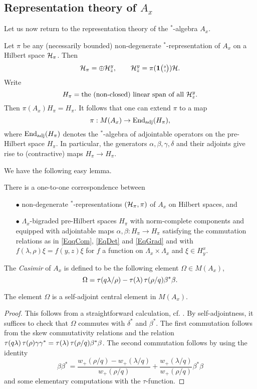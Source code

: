 \subsection{Representation theory of $A_x$}

Let us now return to the representation theory of the $^*$-algebra $A_x$.

Let $\pi$ be any (necessarily bounded) non-degenerate $^*$-representation of $A_x$ on a Hilbert space $\mathcal{H}_{\pi}$. Then \[\mathcal{H}_{\pi} = \oplus \mathcal{H}^{y}_{z},\qquad \mathcal{H}^{y}_{z} = \pi(\mathbf{1}{\tiny {\begin{pmatrix} y\\z\end{pmatrix}}})\mathcal{H}.\] Write \[H_{\pi} =  \textrm{the (non-closed) linear span of all }\mathcal{H}^{y}_{z}.\] Then $\pi(A_x)H_{\pi} = H_{\pi}$. It follows that one can extend $\pi$ to a map \[\pi: M(A_x) \rightarrow \operatorname{\mathrm{End}}_{\operatorname{\mathrm{adj}}}(H_{\pi}),\] where $\operatorname{\mathrm{End}}_{\operatorname{\mathrm{adj}}}(H_{\pi})$ denotes the $^*$-algebra of adjointable operators on the pre-Hilbert space $H_{\pi}$. In particular, the generators $\alpha,\beta,\gamma,\delta$ and their adjoints give rise to (contractive) maps $H_{\pi}\rightarrow H_{\pi}$. 

We have the following easy lemma.

\begin{Lem} There is a one-to-one correspondence between\begin{itemize}\item[$\bullet$] non-degenerate $^*$-representations $(\mathcal{H}_{\pi},\pi)$ of $A_x$ on Hilbert spaces, and 
\item[$\bullet$] $\Lambda_x$-bigraded pre-Hilbert spaces $H_{\pi}$ with norm-complete components and equipped with adjointable maps $\alpha,\beta:H_{\pi}\rightarrow H_{\pi}$ satisfying the commutation relations as in \eqref{EqqCom}, \eqref{EqDet} and \eqref{EqGrad} and with $f(\lambda,\rho)\xi = f(y,z)\xi$ for $f$ a function on $\Lambda_x\times \Lambda_x$ and $\xi\in H^x_y$.
\end{itemize}
\end{Lem}

\begin{Def} The \emph{Casimir} of $A_x$ is defined to be the following element $\Omega\in M(A_x)$, \[\Omega = \operatorname{\tau}(q\lambda/\rho) - \operatorname{\tau}(\lambda)\operatorname{\tau}(\rho/q)\beta^*\beta.\]  
\end{Def}

\begin{Lem} The element $\Omega$ is a self-adjoint central element in $M(A_x)$.
\end{Lem}
\begin{proof}
This follows from a straightforward calculation, cf. \cite[Lemma 3.3]{KoR1}. By self-adjointness, it suffices to check that $\Omega$ commutes with $\delta^*$ and $\beta^*$. The first commutation follows from the skew commutativity relations and the relation $\operatorname{\tau}(q\lambda)\operatorname{\tau}(\rho)\gamma\gamma^* =\operatorname{\tau}(\lambda)\operatorname{\tau}(\rho/q)\beta^*\beta$. The second commutation follows by using the identity \[\beta\beta^* =  \frac{w_+(\rho/q)-w_+(\lambda/q)}{w_+(\rho/q)} + \frac{w_+(\lambda/q)}{w_+(\rho/q)}\beta^*\beta\] and some elementary computations with the $\tau$-function.
\end{proof}

